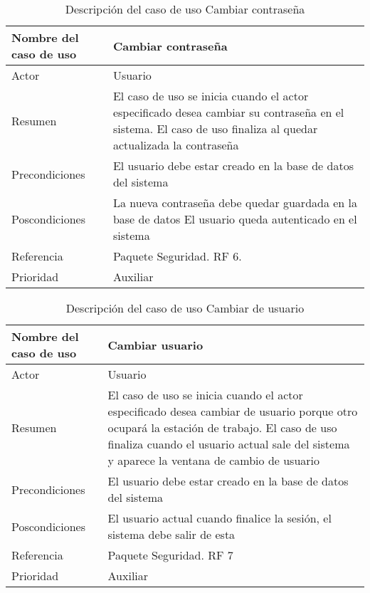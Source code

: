 \begin{table}[H]
	\sf
	\begin{supertabular}{|p{4.5cm}|p{12cm}|}
		\hline
		\textbf{Nombre del caso de uso}
		& \textbf{Cambiar contraseña} \\ \hline
		
		Actor
		& Usuario \\ \hline
		
		Resumen
		& El caso de uso se inicia cuando el actor especificado desea cambiar su contraseña en el sistema. El caso de uso finaliza al quedar actualizada la contraseña \\ \hline
		
		Precondiciones
		& El usuario debe estar creado en la base de datos del sistema \\ \hline
		
		Poscondiciones
		& La nueva contraseña debe quedar guardada en la base de datos
		El usuario queda autenticado en el sistema \\ \hline
		
		Referencia
		& Paquete Seguridad. RF 6. \\ \hline
		
		Prioridad
		& Auxiliar \\		
		\hline
	\end{supertabular}
	\caption[Descripción del caso de uso Cambiar contraseña]{Descripción del caso de uso Cambiar contraseña}
	\label{table:CU_CambPass}
\end{table}

\begin{table}[H]
	\sf
	\begin{supertabular}{|p{4.5cm}|p{12cm}|}
		\hline
		\textbf{Nombre del caso de uso}
		& \textbf{Cambiar usuario} \\ \hline
		
		Actor
		& Usuario \\ \hline
		
		Resumen
		& El caso de uso se inicia cuando el actor especificado desea cambiar de usuario porque otro ocupará la estación de trabajo. El caso de uso finaliza cuando el usuario actual sale del sistema y aparece la ventana de cambio de usuario \\ \hline
		
		Precondiciones
		& El usuario debe estar creado en la base de datos del sistema \\ \hline
		
		Poscondiciones
		& El usuario actual cuando finalice la sesión, el sistema debe salir de esta \\ \hline
		
		Referencia
		& Paquete Seguridad. RF 7 \\ \hline
		
		Prioridad
		& Auxiliar \\		
		\hline
	\end{supertabular}
	\caption[Descripción del caso de uso Cambiar de usuario]{Descripción del caso de uso Cambiar de usuario}
	\label{table:CU_CambUser}
\end{table}

